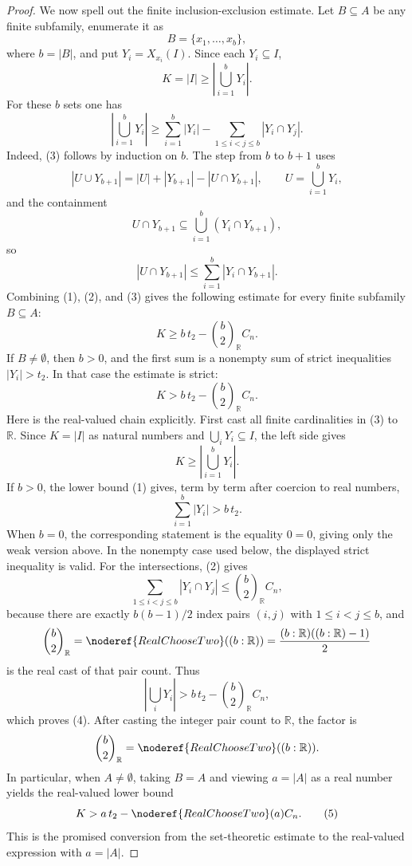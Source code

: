 \begin{proof}
We now spell out the finite inclusion-exclusion estimate.  Let
\(B\subseteq A\) be any finite subfamily, enumerate it as
\[
B=\{x_1,\ldots,x_b\},
\]
where \(b=|B|\), and put \(Y_i=X_{x_i}(I)\).  Since each \(Y_i\subseteq I\),
\[
K=|I|\ge\left|\bigcup_{i=1}^bY_i\right|.
\]
For these \(b\) sets one has
\[
\left|\bigcup_{i=1}^bY_i\right|
\ge
\sum_{i=1}^b |Y_i|
-
\sum_{1\le i<j\le b}|Y_i\cap Y_j|. \tag{3}
\]
Indeed, (3) follows by induction on \(b\).  The step from \(b\) to \(b+1\) uses
\[
|U\cup Y_{b+1}|=|U|+|Y_{b+1}|-|U\cap Y_{b+1}|,
\qquad U=\bigcup_{i=1}^bY_i,
\]
and the containment
\[
U\cap Y_{b+1}
\subseteq
\bigcup_{i=1}^b(Y_i\cap Y_{b+1}),
\]
so
\[
|U\cap Y_{b+1}|
\le
\sum_{i=1}^b |Y_i\cap Y_{b+1}|.
\]
Combining (1), (2), and (3) gives the following estimate for every finite
subfamily \(B\subseteq A\):
\[
K\ge
b\,t_2-\binom{b}{2}_{\mathbb R}C_n.
\]
If \(B\ne\emptyset\), then \(b>0\), and the first sum is a nonempty sum of
strict inequalities \(|Y_i|>t_2\).  In that case the estimate is strict:
\[
K>
b\,t_2-\binom{b}{2}_{\mathbb R}C_n. \tag{4}
\]
Here is the real-valued chain explicitly.  First cast all finite cardinalities
in (3) to \(\mathbb R\).  Since \(K=|I|\) as natural numbers and
\(\bigcup_iY_i\subseteq I\), the left side gives
\[
K\ge \left|\bigcup_{i=1}^bY_i\right|.
\]
If \(b>0\), the lower bound (1) gives, term by term after coercion to real
numbers,
\[
\sum_{i=1}^b |Y_i|> b\,t_2.
\]
When \(b=0\), the corresponding statement is the equality \(0=0\), giving
only the weak version above.  In the nonempty case used below, the displayed
strict inequality is valid.
For the intersections, (2) gives
\[
\sum_{1\le i<j\le b}|Y_i\cap Y_j|
\le \binom{b}{2}_{\mathbb R}C_n,
\]
because there are exactly \(b(b-1)/2\) index pairs
\((i,j)\) with \(1\le i<j\le b\), and
\[
\binom{b}{2}_{\mathbb R}
=\noderef{RealChooseTwo}((b:\mathbb R))
=\frac{(b:\mathbb R)((b:\mathbb R)-1)}2
\]
is the real cast of that pair count.  Thus
\[
\left|\bigcup_iY_i\right|
>
b\,t_2-\binom{b}{2}_{\mathbb R}C_n,
\]
which proves (4).  After casting the integer pair count to \(\mathbb R\), the
factor is
\[
\binom{b}{2}_{\mathbb R}=\noderef{RealChooseTwo}((b:\mathbb R)).
\]
In particular, when \(A\ne\emptyset\), taking \(B=A\) and viewing
\(a=|A|\) as a real number yields the real-valued lower bound
\[
K>
a\,t_2-\noderef{RealChooseTwo}(a)C_n. \tag{5}
\]
This is the promised conversion from the set-theoretic estimate to the
real-valued expression with \(a=|A|\).


\end{proof}
